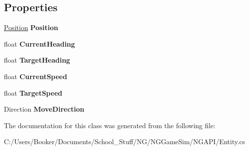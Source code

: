 \subsection*{Properties}
\begin{DoxyCompactItemize}
\item 
\mbox{\label{class_n_g_a_p_i_1_1_entity_ab92947cb4086d73db774a894f954ed11}} 
\hyperlink{struct_n_g_a_p_i_1_1_position}{Position} {\bfseries Position}
\item 
\mbox{\label{class_n_g_a_p_i_1_1_entity_a02e840fad7d93bfe75e0290e10f92519}} 
float {\bfseries Current\+Heading}
\item 
\mbox{\label{class_n_g_a_p_i_1_1_entity_a2364f38ceb8811a948fc872da69dbff3}} 
float {\bfseries Target\+Heading}
\item 
\mbox{\label{class_n_g_a_p_i_1_1_entity_a65b95fe0e304f77d70dc81bb46fb2f4c}} 
float {\bfseries Current\+Speed}
\item 
\mbox{\label{class_n_g_a_p_i_1_1_entity_a49cb53df362a43d0a72cefcef3d67f8f}} 
float {\bfseries Target\+Speed}
\item 
\mbox{\label{class_n_g_a_p_i_1_1_entity_a273683451f9500e87eb5fd79be4feebd}} 
Direction {\bfseries Move\+Direction}
\end{DoxyCompactItemize}


The documentation for this class was generated from the following file\+:\begin{DoxyCompactItemize}
\item 
C\+:/\+Users/\+Booker/\+Documents/\+School\+\_\+\+Stuff/\+N\+G/\+N\+G\+Game\+Sim/\+N\+G\+A\+P\+I/Entity.\+cs\end{DoxyCompactItemize}
